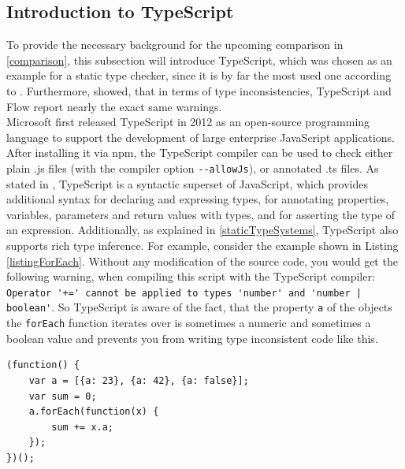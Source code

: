 \documentclass[runningheads,a4paper]{llncs}
\begin{document}
\subsection{Introduction to TypeScript} \label{IntroToTS}
To provide the necessary background for the upcoming comparison in \ref{comparison}, this subsection will introduce TypeScript, which was chosen as an example for a static type checker, since it is by far the most used one according to \cite{StateOfJs}.
Furthermore, \cite{DBLP:conf/icse/GaoBB17} showed, that in terms of type inconsistencies, TypeScript and Flow report nearly the exact same warnings.\\
Microsoft first released TypeScript in 2012 as an open-source programming language to support the development of large enterprise JavaScript applications. 
After installing it via npm, the TypeScript compiler can be used to check either plain .js files (with the compiler option  \lstinline[columns=fixed]{--allowJs}), or annotated .ts files.
As stated in \cite{DBLP:conf/ecoop/BiermanAT14}, TypeScript is a syntactic superset of JavaScript, which provides additional syntax for declaring and expressing types, for annotating properties, variables, parameters and return values with types, and for asserting the type of an expression.
Additionally, as explained in \ref{staticTypeSystems}, TypeScript also supports rich type inference.
For example, consider the example shown in Listing \ref{listingForEach}.
Without any modification of the source code, you would get the following warning, when compiling this script with the TypeScript compiler:
\lstinline[columns=fixed]{Operator '+=' cannot be applied to types 'number' and 'number | boolean'}.
So TypeScript is aware of the fact, that the property \lstinline[columns=fixed]{a} of the objects the \lstinline[columns=fixed]{forEach} function iterates over is sometimes a numeric and sometimes a boolean value and prevents you from writing type inconsistent code like this.

\medskip\medskip
\lstset{language=javascript}
\begin{minipage}{\linewidth}
\begin{lstlisting}[frame=single, caption=Inconsistent ForEach, label=listingForEach]
(function() {
    var a = [{a: 23}, {a: 42}, {a: false}];
    var sum = 0;
    a.forEach(function(x) {
        sum += x.a;
    });
})();
\end{lstlisting}
\end{minipage}
\end{document}
